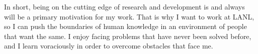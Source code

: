 In short, being on the cutting edge of research and development 
is and always will be a primary motivation for my work. That is why I want 
to work at LANL, so I can push the boundaries of human knowledge in an
environment of people that want the same. I enjoy facing problems that have 
never been solved before, and I learn voraciously in order to overcome 
obstacles that face me.